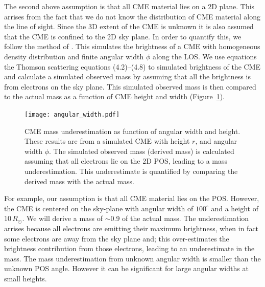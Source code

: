 The second above assumption is that all CME material lies on a 2D plane. This arrises from the fact that we do not know the distribution of CME material along the line of sight. Since the 3D extent of the CME is unknown it is also assumed that the CME is confined to the 2D sky plane. In order to quantify this, we follow the method of \citep{vou00}. This simulates the brightness of a CME with homogeneous density distribution and finite angular width $\phi$ along the LOS. We use equations the Thomson scattering equations (4.2)--(4.8) to simulated brightness of the CME and calculate a simulated observed mass by assuming that all the brightness is from electrons on the sky plane. This simulated observed mass is then compared to the actual mass as a function of CME height and width (Figure~\ref{fig:ang_width_error}).
\begin{figure}[!t]
\begin{center}
\texttt{[image: angular\_width.pdf]}
\caption[Uncertainty due to CME angular width]{CME mass underestimation as function of angular width and height. These results are from a simulated CME with height $r$, and angular width $\phi$. The simulated observed mass (derived mass) is calculated assuming that all electrons lie on the 2D POS, leading to a mass underestimation. This underestimate is quantified by comparing the derived mass with the actual mass.}
\label{fig:ang_width_error}
\end{center}
\end{figure}
For example, our assumption is that all CME material lies on the POS. However, the CME is centered on the sky-plane with angular width of $100^{\circ}$ and a height of $10\,R_{\odot}$. We will derive a mass of $\sim$0.9 of the actual mass. The underestimation arrises because all electrons are emitting their maximum brightness, when in fact some electrons are away from the sky plane and; this over-estimates the brightness contribution from those electrons, leading to an underestimate in the mass. The mass underestimation from unknown angular width is smaller than the unknown POS angle. However it can be significant for large angular widths at small heights.


